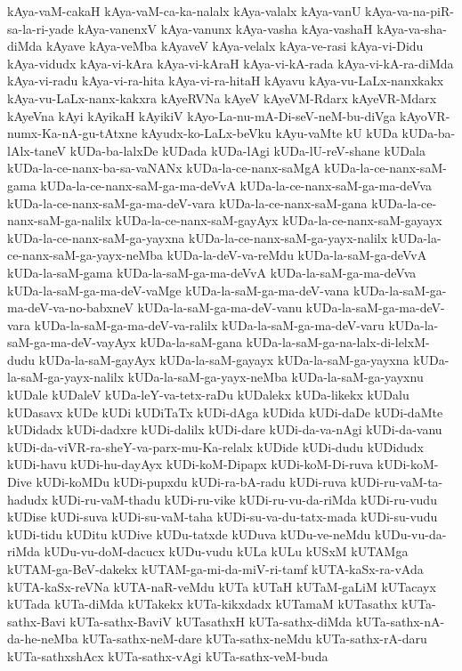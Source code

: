 {kAya-vaM-cakaH
kAya-vaM-ca-ka-nalalx
kAya-valalx
kAya-vanU
kAya-va-na-piR-sa-la-ri-yade
kAya-vanenxV
kAya-vanunx
kAya-vasha
kAya-vashaH
kAya-va-sha-diMda
kAyave
kAya-veMba
kAyaveV
kAya-velalx
kAya-ve-rasi
kAya-vi-Didu
kAya-vidudx
kAya-vi-kAra
kAya-vi-kAraH
kAya-vi-kA-rada
kAya-vi-kA-ra-diMda
kAya-vi-radu
kAya-vi-ra-hita
kAya-vi-ra-hitaH
kAyavu
kAya-vu-LaLx-nanxkakx
kAya-vu-LaLx-nanx-kakxra
kAyeRVNa
kAyeV
kAyeVM-Rdarx
kAyeVR-Mdarx
kAyeVna
kAyi
kAyikaH
kAyikiV
kAyo-La-nu-mA-Di-seV-neM-bu-diVga
kAyoVR-numx-Ka-nA-gu-tAtxne
kAyudx-ko-LaLx-beVku
kAyu-vaMte
kU
kUDa
kUDa-ba-lAlx-taneV
kUDa-ba-lalxDe
kUDada
kUDa-lAgi
kUDa-lU-reV-shane
kUDala
kUDa-la-ce-nanx-ba-sa-vaNANx
kUDa-la-ce-nanx-saMgA
kUDa-la-ce-nanx-saM-gama
kUDa-la-ce-nanx-saM-ga-ma-deVvA
kUDa-la-ce-nanx-saM-ga-ma-deVva
kUDa-la-ce-nanx-saM-ga-ma-deV-vara
kUDa-la-ce-nanx-saM-gana
kUDa-la-ce-nanx-saM-ga-nalilx
kUDa-la-ce-nanx-saM-gayAyx
kUDa-la-ce-nanx-saM-gayayx
kUDa-la-ce-nanx-saM-ga-yayxna
kUDa-la-ce-nanx-saM-ga-yayx-nalilx
kUDa-la-ce-nanx-saM-ga-yayx-neMba
kUDa-la-deV-va-reMdu
kUDa-la-saM-ga-deVvA
kUDa-la-saM-gama
kUDa-la-saM-ga-ma-deVvA
kUDa-la-saM-ga-ma-deVva
kUDa-la-saM-ga-ma-deV-vaMge
kUDa-la-saM-ga-ma-deV-vana
kUDa-la-saM-ga-ma-deV-va-no-babxneV
kUDa-la-saM-ga-ma-deV-vanu
kUDa-la-saM-ga-ma-deV-vara
kUDa-la-saM-ga-ma-deV-va-ralilx
kUDa-la-saM-ga-ma-deV-varu
kUDa-la-saM-ga-ma-deV-vayAyx
kUDa-la-saM-gana
kUDa-la-saM-ga-na-lalx-di-lelxM-dudu
kUDa-la-saM-gayAyx
kUDa-la-saM-gayayx
kUDa-la-saM-ga-yayxna
kUDa-la-saM-ga-yayx-nalilx
kUDa-la-saM-ga-yayx-neMba
kUDa-la-saM-ga-yayxnu
kUDale
kUDaleV
kUDa-leY-va-tetx-raDu
kUDalekx
kUDa-likekx
kUDalu
kUDasavx
kUDe
kUDi
kUDiTaTx
kUDi-dAga
kUDida
kUDi-daDe
kUDi-daMte
kUDidadx
kUDi-dadxre
kUDi-dalilx
kUDi-dare
kUDi-da-va-nAgi
kUDi-da-vanu
kUDi-da-viVR-ra-sheY-va-parx-mu-Ka-relalx
kUDide
kUDi-dudu
kUDidudx
kUDi-havu
kUDi-hu-dayAyx
kUDi-koM-Dipapx
kUDi-koM-Di-ruva
kUDi-koM-Dive
kUDi-koMDu
kUDi-pupxdu
kUDi-ra-bA-radu
kUDi-ruva
kUDi-ru-vaM-ta-hadudx
kUDi-ru-vaM-thadu
kUDi-ru-vike
kUDi-ru-vu-da-riMda
kUDi-ru-vudu
kUDise
kUDi-suva
kUDi-su-vaM-taha
kUDi-su-va-du-tatx-mada
kUDi-su-vudu
kUDi-tidu
kUDitu
kUDive
kUDu-tatxde
kUDuva
kUDu-ve-neMdu
kUDu-vu-da-riMda
kUDu-vu-doM-dacucx
kUDu-vudu
kULa
kULu
kUSxM
kUTAMga
kUTAM-ga-BeV-dakekx
kUTAM-ga-mi-da-miV-ri-tamf
kUTA-kaSx-ra-vAda
kUTA-kaSx-reVNa
kUTA-naR-veMdu
kUTa
kUTaH
kUTaM-gaLiM
kUTacayx
kUTada
kUTa-diMda
kUTakekx
kUTa-kikxdadx
kUTamaM
kUTasathx
kUTa-sathx-Bavi
kUTa-sathx-BaviV
kUTasathxH
kUTa-sathx-diMda
kUTa-sathx-nA-da-he-neMba
kUTa-sathx-neM-dare
kUTa-sathx-neMdu
kUTa-sathx-rA-daru
kUTa-sathxshAcx
kUTa-sathx-vAgi
kUTa-sathx-veM-buda
}
